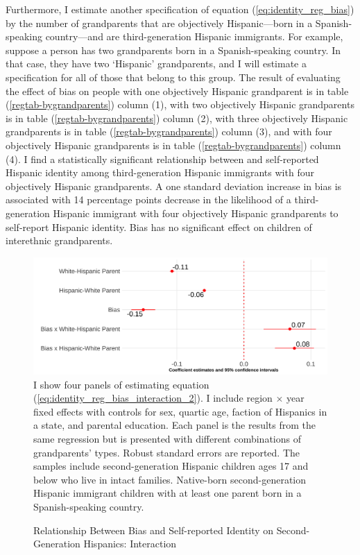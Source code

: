 \documentclass[12pt, fullpage]{article}
\newcommand{\note}[1]{\flushleft\footnotesize{#1}}
\begin{document}
Furthermore, I estimate another specification of equation (\ref{eq:identity_reg_bias}) by the number of grandparents that are objectively Hispanic---born in a Spanish-speaking country---and are third-generation Hispanic immigrants. For example, suppose a person has two grandparents born in a Spanish-speaking country. In that case, they have two `Hispanic' grandparents, and I will estimate a specification for all of those that belong to this group. The result of evaluating the effect of bias on people with one objectively Hispanic grandparent is in table (\ref{regtab-bygrandparents}) column (1), with two objectively Hispanic grandparents is in table (\ref{regtab-bygrandparents}) column (2), with three objectively Hispanic grandparents is in table (\ref{regtab-bygrandparents}) column (3), and with four objectively Hispanic grandparents is in table (\ref{regtab-bygrandparents}) column (4). I find a statistically significant relationship between and self-reported Hispanic identity among third-generation Hispanic immigrants with four objectively Hispanic grandparents. A one standard deviation increase in bias is associated with 14 percentage points decrease in the likelihood of a third-generation Hispanic immigrant with four objectively Hispanic grandparents to self-report Hispanic identity. Bias has no significant effect on children of interethnic grandparents.  



\begin{center}
\begin{figure}[H]
\caption{Relationship Between Bias and Self-reported Identity on Second-Generation Hispanics: Interaction}
\includegraphics[width=\textwidth]{figure/skin-iat-regression-interaction-bygen-plot-second.png} 
\label{fig:reg-interaction-second}
\flushleft\footnotesize{\note{I show four panels of estimating equation (\ref{eq:identity_reg_bias_interaction_2}). I include region $\times$ year fixed effects with controls for sex, quartic age, faction of Hispanics in a state, and parental education. Each panel is the results from the same regression but is presented with different combinations of grandparents' types. Robust standard errors are reported. The samples include second-generation Hispanic children ages 17 and below who live in intact families. Native-born second-generation Hispanic immigrant children with at least one parent born in a Spanish-speaking country.}}
\end{figure}
\end{center}
\end{document}

